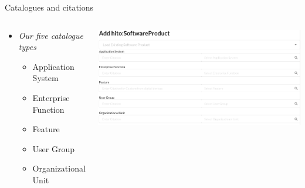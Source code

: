\documentclass[aspectratio=1610,12pt]{beamer}
\begin{document}
\begin{frame}{Catalogues and citations}
\begin{columns}
  \vspace{-1cm}
  \begin{spacing}{1.25}
    \begin{itemize}
      \item \emph{Our five catalogue types}
      \begin{itemize}
        \item Application System
        \item Enterprise Function
        \item Feature
        \item User Group
        \item Organizational Unit
      \end{itemize}
    \end{itemize}
  \end{spacing}
  \centering
  \includegraphics[width=\textwidth]{img/iglook.png}
\end{columns}
\end{frame}
\end{document}
